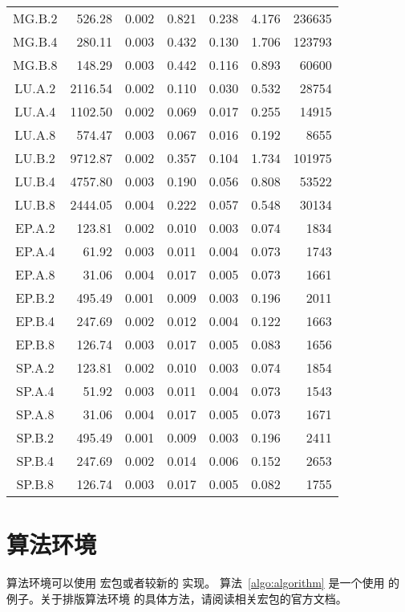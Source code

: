 \documentclass{sjtureport}
\begin{document}
\begin{ThreePartTable}
\begin{longtable}[c]{c*{6}{r}}
	MG.B.2 & 526.28 & 0.002 & 0.821 & 0.238 & 4.176 & 236635 \\
	MG.B.4 & 280.11 & 0.003 & 0.432 & 0.130 & 1.706 & 123793 \\
	MG.B.8 & 148.29 & 0.003 & 0.442 & 0.116 & 0.893 & 60600 \\
	LU.A.2 & 2116.54 & 0.002 & 0.110 & 0.030 & 0.532 & 28754 \\
	LU.A.4 & 1102.50 & 0.002 & 0.069 & 0.017 & 0.255 & 14915 \\
	LU.A.8 & 574.47 & 0.003 & 0.067 & 0.016 & 0.192 & 8655 \\
	LU.B.2 & 9712.87 & 0.002 & 0.357 & 0.104 & 1.734 & 101975 \\
	LU.B.4 & 4757.80 & 0.003 & 0.190 & 0.056 & 0.808 & 53522 \\
	LU.B.8 & 2444.05 & 0.004 & 0.222 & 0.057 & 0.548 & 30134 \\
	EP.A.2 & 123.81 & 0.002 & 0.010 & 0.003 & 0.074 & 1834 \\
	EP.A.4 & 61.92 & 0.003 & 0.011 & 0.004 & 0.073 & 1743 \\
	EP.A.8 & 31.06 & 0.004 & 0.017 & 0.005 & 0.073 & 1661 \\
	EP.B.2 & 495.49 & 0.001 & 0.009 & 0.003 & 0.196 & 2011 \\
	EP.B.4 & 247.69 & 0.002 & 0.012 & 0.004 & 0.122 & 1663 \\
	EP.B.8 & 126.74 & 0.003 & 0.017 & 0.005 & 0.083 & 1656 \\
	SP.A.2 & 123.81 & 0.002 & 0.010 & 0.003 & 0.074 & 1854 \\
	SP.A.4 & 51.92 & 0.003 & 0.011 & 0.004 & 0.073 & 1543 \\
	SP.A.8 & 31.06 & 0.004 & 0.017 & 0.005 & 0.073 & 1671 \\
	SP.B.2 & 495.49 & 0.001 & 0.009 & 0.003 & 0.196 & 2411 \\
	SP.B.4 \tnote{a} & 247.69 & 0.002 & 0.014 & 0.006 & 0.152 & 2653 \\
	SP.B.8 \tnote{b} & 126.74 & 0.003 & 0.017 & 0.005 & 0.082 & 1755 \\
	\bottomrule
	\end{longtable}
\end{ThreePartTable}

\section{算法环境}

算法环境可以使用  宏包或者较新的  实现。
算法~\ref{algo:algorithm} 是一个使用  的例子。关于排版算法环境
的具体方法，请阅读相关宏包的官方文档。
\end{document}
